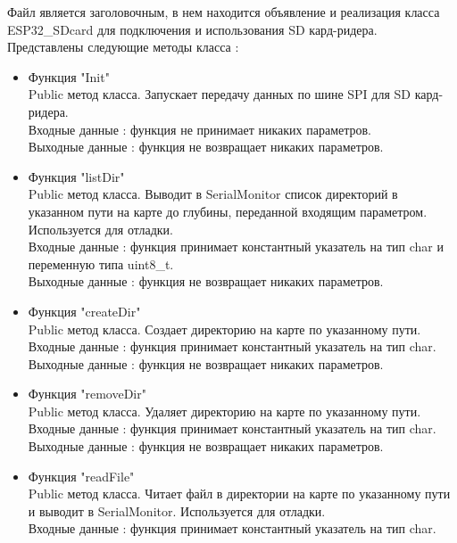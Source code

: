 \documentclass[a4document]{article}
\begin{document}
{\begin{itemize}
        Файл является заголовочным, в нем находится объявление и реализация класса ESP32\_SDcard
        для подключения и использования SD кард-ридера.
        Представлены следующие методы класса : 
        \begin{itemize}
            \item Функция "Init" \\ 
                Public метод класса. Запускает передачу данных по шине SPI для SD кард-ридера. \\
                Входные данные : функция не принимает никаких параметров. \\
                Выходные данные : функция не возвращает никаких параметров.
            \newpage
            \item Функция "listDir" \\ 
                Public метод класса. Выводит в SerialMonitor список директорий в указанном пути на карте до глубины, 
                переданной входящим параметром. Используется для отладки.\\
                Входные данные : функция принимает константный указатель на тип char и переменную типа uint8\_t. \\
                Выходные данные : функция не возвращает никаких параметров.
            \item Функция "createDir" \\ 
                Public метод класса. Создает директорию на карте по указанному пути. \\ 
                Входные данные : функция принимает константный указатель на тип char. \\
                Выходные данные : функция не возвращает никаких параметров.
            \item Функция "removeDir" \\ 
                Public метод класса. Удаляет директорию на карте по указанному пути. \\ 
                Входные данные : функция принимает константный указатель на тип char. \\
                Выходные данные : функция не возвращает никаких параметров.
            \item Функция "readFile" \\
                Public метод класса. Читает файл в директории на карте по указанному пути и 
                выводит в SerialMonitor. Используется для отладки. \\ 
                Входные данные : функция принимает константный указатель на тип char. \\

\end{itemize}
\end{itemize}}
\end{document}
